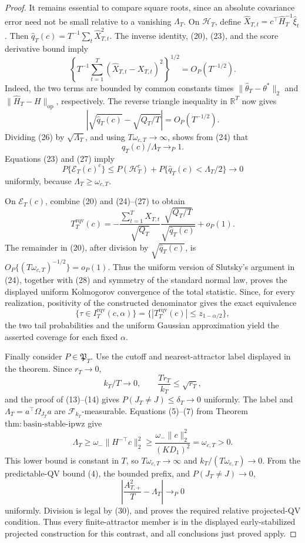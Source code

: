 \documentclass{article}
\begin{document}
\begin{proof}
It remains essential to compare square roots, since an absolute covariance error need not be small relative to a vanishing \(\Lambda_T\).  On \(\mathcal H_T\), define \(\widehat X_{T,t}=c^\top\widehat H_T^{-1}\widehat\xi_t\).  Then \(\widehat q_T(c)=T^{-1}\sum_t\widehat X_{T,t}^2\).  The inverse identity, (20), (23), and the score derivative bound imply
\[
 \left\{T^{-1}\sum_{t=1}^T(\widehat X_{T,t}-X_{T,t})^2\right\}^{1/2}
 =O_P(T^{-1/2}).                                                           \tag{25}
\]
Indeed, the two terms are bounded by common constants times \(\|\widehat\theta_T-\theta^*\|_2\) and \(\|\widehat H_T-H\|_{\mathrm{op}}\), respectively.  The reverse triangle inequality in \(\mathbb R^T\) now gives
\[
 \left|\sqrt{\widehat q_T(c)}-\sqrt{Q_T/T}\right|=O_P(T^{-1/2}).         \tag{26}
\]
Dividing (26) by \(\sqrt{\Lambda_T}\), and using \(T\omega_{c,T}\to\infty\), shows from (24) that
\[
 \widehat q_T(c)/\Lambda_T\to_P1.                                       \tag{27}
\]
Equations (23) and (27) imply
\[
 P\{\mathcal E_T(c)^c\}
 \le P(\mathcal H_T^c)+P\{\widehat q_T(c)<\Lambda_T/2\}\to0            \tag{28}
\]
uniformly, because \(\Lambda_T\ge\omega_{c,T}\).

On \(\mathcal E_T(c)\), combine (20) and (24)--(27) to obtain
\[
 T_T^{\mathrm{rqv}}(c)
 =-\frac{\sum_{t=1}^TX_{T,t}}{\sqrt{Q_T}}
   \frac{\sqrt{Q_T/T}}{\sqrt{\widehat q_T(c)}}+o_P(1).                  \tag{29}
\]
The remainder in (20), after division by \(\sqrt{\widehat q_T(c)}\), is \(O_P\{(T\omega_{c,T})^{-1/2}\}=o_P(1)\).  Thus the uniform version of Slutsky's argument in (24), together with (28) and symmetry of the standard normal law, proves the displayed uniform Kolmogorov convergence of the total statistic.  Since, for every realization, positivity of the constructed denominator gives the exact equivalence
\[
 \{\tau\in I_T^{\mathrm{rqv}}(c,\alpha)\}
 =\{|T_T^{\mathrm{rqv}}(c)|\le z_{1-\alpha/2}\},
\]
the two tail probabilities and the uniform Gaussian approximation yield the asserted coverage for each fixed \(\alpha\).

Finally consider \(P\in\mathfrak P_T\).  Use the cutoff and nearest-attractor label displayed in the theorem.  Since \(r_T\to0\),
\[
 k_T/T\to0,
 \qquad
 \frac{Tr_T}{k_T}\le\sqrt{r_T},
\]
and the proof of (13)--(14) gives \(P(J_T\ne J)\le\delta_T\to0\) uniformly.  The label and
\(\Lambda_T=a^\top\Omega_{J_T}a\) are \(\mathcal F_{k_T}\)-measurable.  Equations (5)--(7) from Theorem \(\mathrm{thm:basin\text{-}stable\text{-}ipwz}\) give
\[
 \Lambda_T\ge\omega_-\|H^{-\top}c\|_2^2
 \ge\frac{\omega_-\|c\|_2^2}{(KD_1)^2}=\omega_{c,T}>0.                 \tag{30}
\]
This lower bound is constant in \(T\), so \(T\omega_{c,T}\to\infty\) and \(k_T/(T\omega_{c,T})\to0\).  From the predictable-QV bound (4), the bounded prefix, and \(P(J_T\ne J)\to0\),
\[
 \left|\frac{A_{T,+}^2}{T}-\Lambda_T\right|\to_P0
\]
uniformly.  Division is legal by (30), and proves the required relative projected-QV condition.  Thus every finite-attractor member is in the displayed early-stabilized projected construction for this contrast, and all conclusions just proved apply.
\end{proof}
\end{document}
